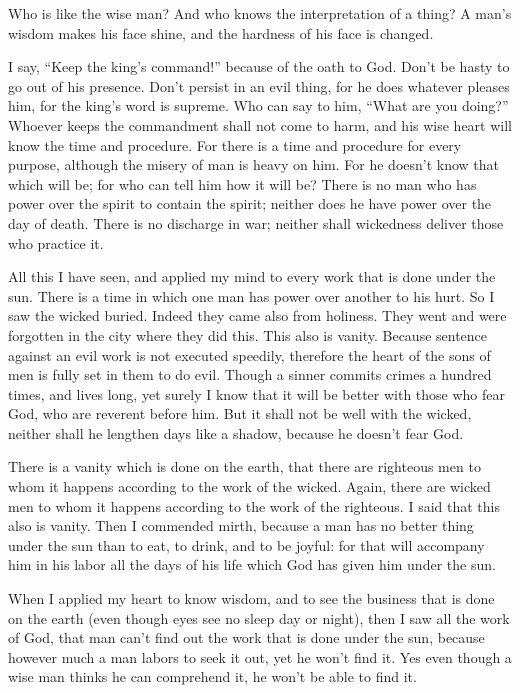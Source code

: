 \mychapter{} \myverse*{}Who is like the wise man? And who knows the interpretation of a
thing? A man’s wisdom makes his face shine, and the hardness of his face is changed.

\myverse{}I say, “Keep the king’s command!” because of the oath to God.
\myverse{}Don’t be hasty to go out of his presence. Don’t persist in an evil thing, for
he does whatever pleases him,
\myverse{}for the king’s word is supreme. Who can say to him, “What are you doing?”
\myverse{}Whoever keeps the commandment shall not come to harm, and his wise heart will
know the time and procedure.
\myverse{}For there is a time and procedure for every purpose, although the misery of
man is heavy on him.
\myverse{}For he doesn’t know that which will be; for who can tell him how it will be?
\myverse{}There is no man who has power over the spirit to contain the spirit; neither
does he have power over the day of death. There is no discharge in war; neither shall wickedness deliver
those who practice it.

\myverse{}All this I have seen, and applied my mind to every work that is
done under the sun. There is a time in which one man has power over another to his hurt.
\myverse{}So I saw the wicked buried. Indeed they came also from holiness. They went
and were forgotten in the city where they did this. This also is vanity.
\myverse{}Because sentence against an evil work is not executed speedily, therefore
the heart of the sons of men is fully set in them to do evil.
\myverse{}Though a sinner commits crimes a hundred times, and lives long, yet surely
I know that it will be better with those who fear God, who are reverent before him.
\myverse{}But it shall not be well with the wicked, neither shall he lengthen days like
a shadow, because he doesn’t fear God.

\myverse{}There is a vanity which is done on the earth, that there are
righteous men to whom it happens according to the work of the wicked. Again, there are wicked men to whom
it happens according to the work of the righteous. I said that this also is vanity.
\myverse{}Then I commended mirth, because a man has no better thing under the sun than
to eat, to drink, and to be joyful: for that will accompany him in his labor all the days of his life
which God has given him under the sun.

\myverse{}When I applied my heart to know wisdom, and to see the business
that is done on the earth (even though eyes see no sleep day or night),
\myverse{}then I saw all the work of God, that man can’t find out the work that is done
under the sun, because however much a man labors to seek it out, yet he won’t find it. Yes even though
a wise man thinks he can comprehend it, he won’t be able to find it.



